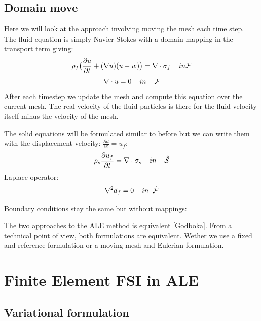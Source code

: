 \subsection*{Domain move}
Here we will look at the approach involving moving the mesh each time step. \\
The fluid equation is simply Navier-Stokes with a domain mapping in the transport term giving:
$$ \rho_f \big( \frac{\partial u}{\partial t} + (\nabla u)(u-w)\big) = \nabla \cdot \sigma_f \hspace{4mm} in \mathcal{F}$$
$$ \nabla \cdot u = 0  \hspace{4mm} in \hspace{4mm} \mathcal{F} $$
After each timestep we update the mesh and compute this equation over the current mesh. The real velocity of the fluid particles is there for the fluid velocity itself minus the velocity of the mesh. 

The solid equations will be formulated similar to before but we can write them with the displacement velocity: $ \frac{\partial d}{\partial t} = u_f $:
$$ \rho_s \frac{\partial u_f}{\partial t} = \nabla \cdot \sigma_s \hspace{4mm}in\hspace{4mm} \mathcal{\hat{S}} $$
Laplace operator:
$$ \nabla^2 d_f = 0\hspace{4mm}in \hspace{2mm} \mathcal{\hat{F}}$$

Boundary conditions stay the same but without mappings:

The two approaches to the ALE method is equivalent [Godboka]. 
From a technical point of view, both formulations are equivalent. Wether we use a fixed and reference formulation or a moving mesh and Eulerian formulation. 
\section*{Finite Element FSI in ALE}
\subsection*{Variational formulation}
